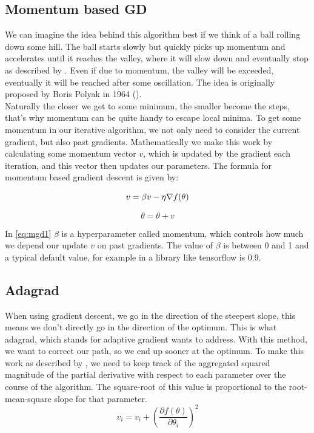 \documentclass[aodsor,preprint]{imsart}
\numberwithin{equation}{section}
\theoremstyle{plain}
\begin{document}
\subsection{Momentum based GD}
We can imagine the idea behind this algorithm best if we think of a ball rolling down some hill. The ball starts slowly but quickly picks up momentum and accelerates until it reaches the valley, where it will slow down and eventually stop as described by \cite{geron2019hands}. Even if due to momentum, the valley will be exceeded, eventually it will be reached after some oscillation. The idea is originally proposed by Boris Polyak in 1964 (\cite{polyak}).\\
Naturally the closer we get to some minimum, the smaller become the steps, that's why momentum can be quite handy to escape local minima. To get some momentum in our iterative algorithm, we not only need to consider the current gradient, but also past gradients. Mathematically we make this work by calculating some momentum vector $v$, which is updated by the gradient each iteration, and this vector then updates our parameters. The formula for momentum based gradient descent is given by:

\begin{equation} \label{eq:mgd1}
v = \beta v - \eta \nabla f(\theta) \\
\end{equation}

\begin{equation} \label{eq:mgd2}
\theta = \theta + v
\end{equation}

In \ref{eq:mgd1} $\beta$ is a hyperparameter called momentum, which controls how much we depend our update $v$ on past gradients. The value of $\beta$ is between 0 and 1 and a typical default value, for example in a library like tensorflow is 0.9.

\subsection{Adagrad}\label{adagrad}
When using gradient descent, we go in the direction of the steepest slope, this means we don't directly go in the direction of the optimum. This is what adagrad, which stands for adaptive gradient wants to address. With this method, we want to correct our path, so we end up sooner at the optimum. To make this work as described by \cite{Aggarwal18}, we need to keep track of the aggregated squared magnitude of the partial derivative with respect to each parameter over the course of the algorithm. The square-root of this value is proportional to the root-mean-square slope for that parameter.
\begin{equation} \label{eq:adagrad1}
v_{i} = v_{i} + \left(\frac{\partial f(\theta)}{\partial \theta_{i}}\right)^2
\end{equation}
\end{document}
